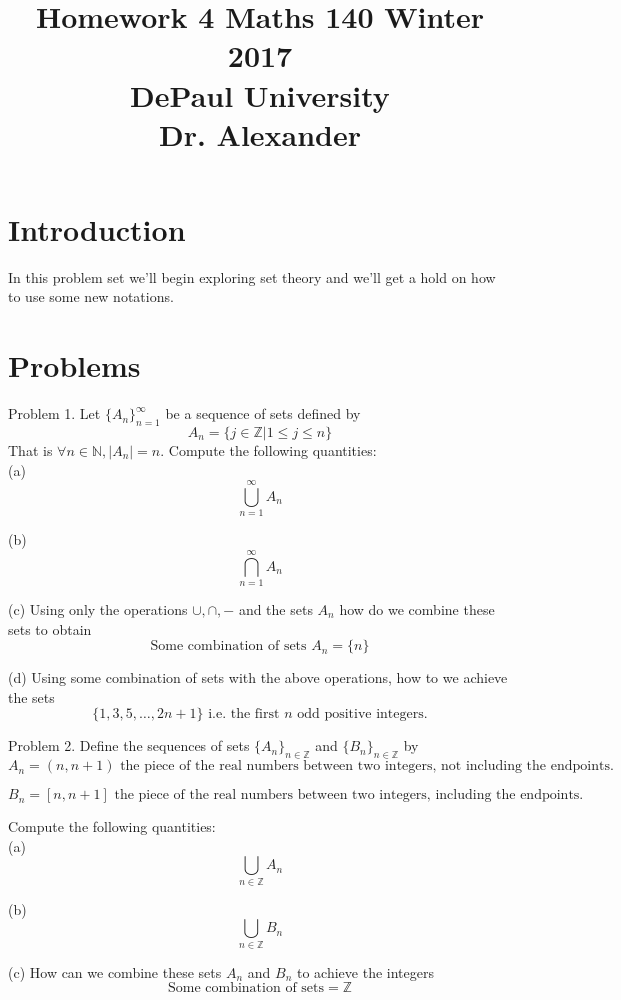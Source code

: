 \documentclass[16 pt]{amsart}
\theoremstyle{definition}
\theoremstyle{remark}
\numberwithin{equation}{subsection}
\newcommand{\Z}{\mathbb{Z}}
\begin{document}
\title{Homework 4 Maths 140 Winter 2017 \\ DePaul University\\Dr. Alexander}
\maketitle

\section{Introduction}
In this problem set we'll begin exploring set theory and we'll get a hold on how to use some new notations.


\section{Problems}

Problem 1. Let $\{A_n\}_{n=1}^{\infty}$ be a sequence of sets defined by
\[
A_n = \{j\in\Z | 1\le j\le n\}
\]
That is $\forall n\in\mathbb{N}, |A_n|=n$.  Compute the following quantities:\\

(a) 
\[
\bigcup_{n=1}^{\infty} A_n
\]

(b) 
\[
\bigcap_{n=1}^{\infty} A_n 
\]

(c) Using only the operations $\cup,\cap,-$ and the sets $A_n$ how do we combine these sets to obtain
\[
\text{Some combination of sets }A_n = \{n\}
\]

(d) Using some combination of sets with the above operations, how to we achieve the sets
\[
\{1,3,5,\dots,2n+1\} \text{ i.e. the first } n \text{ odd positive integers.}
\]

\newpage

Problem 2.  Define the sequences of sets $\{A_n\}_{n\in\Z}$ and $\{B_n\}_{n\in\Z}$ by
\[
A_n = (n,n+1) \text{ the piece of the real numbers between two integers, not including the endpoints.}
\]


\[
B_n = [n,n+1] \text{ the piece of the real numbers between two integers, including the endpoints.}
\]

Compute the following quantities:\\

(a) 
\[
\bigcup_{n\in\Z} A_n
\]

(b)
\[
\bigcup_{n\in\Z} B_n
\]

(c) How can we combine these sets $A_n$ and $B_n$ to achieve the integers
\[
\text{Some combination of sets} = \Z 
\]
\end{document}
